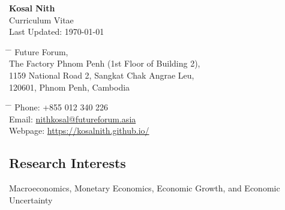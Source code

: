 \documentclass[10pt,a4paper]{article}
\begin{document}
\LARGE{\textbf{Kosal Nith}}\\
	\normalsize{Curriculum Vitae\\
	Last Updated:	\today}

\parbox{0.5\textwidth}{ %
	\begin{tabbing} %
		\hspace{3cm} \= \hspace{4cm} \= \kill %
			Future Forum,\\ 
			The Factory Phnom Penh (1st Floor of Building 2), \\ 
			1159 National Road 2, Sangkat Chak Angrae Leu,\\ 
			120601, Phnom Penh, Cambodia 
	\end{tabbing}}
\hfill %
\parbox{0.5\textwidth}{ %
	\begin{tabbing} %
		\hspace{3cm} \= \hspace{4cm} \= \kill %
			Phone: +855 012 340 226 \\ 
			Email: \href{mailto:nithkosal@futureforum.asia}{nithkosal@futureforum.asia}\\
			Webpage: \href{https://kosalnith.github.io/}{https://kosalnith.github.io/}  
	\end{tabbing}}
\vspace{-1em}

\subsection*{Research Interests}	

	Macroeconomics, Monetary Economics, Economic Growth, and Economic Uncertainty

\end{document}
